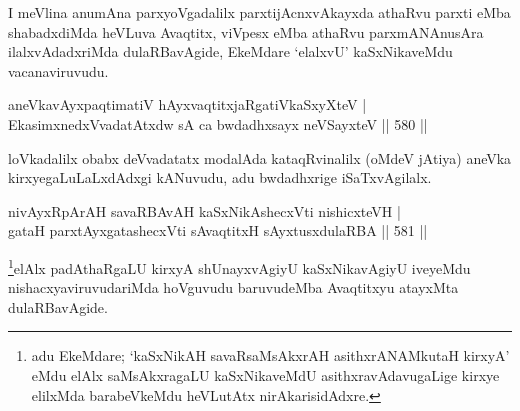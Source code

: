 \begin{artha}
I meVlina anumAna parxyoVgadalilx parxtijAcnxvAkayxda athaRvu parxti eMba shabadxdiMda heVLuva Avaqtitx, viVpesx eMba athaRvu parxmANAnusAra ilalxvAdadxriMda dulaRBavAgide, EkeMdare `elalxvU' kaSxNikaveMdu vacanaviruvudu.
\end{artha}


\begin{shl}
\footnotemark[1]aneVkavAyxpaqtimatiV hAyxvaqtitxjaRgatiVkaSxyXteV | \\
EkasimxnedxVvadatAtxdw sA ca bwdadhxsayx neVSayxteV \hfill||  580 ||  
\end{shl}

\begin{artha}
loVkadalilx obabx deVvadatatx modalAda kataqRvinalilx (oMdeV jAtiya) aneVka kirxyegaLuLaLxdAdxgi kANuvudu, adu bwdadhxrige iSaTxvAgilalx.
\end{artha}

\begin{shl}
nivAyxRpArAH savaRBAvAH kaSxNikAshecxVti nishicxteVH | \\
gataH parxtAyxgatashecxVti sA\s \s vaqtitxH sAyxtusxdulaRBA \hfill||  581 ||  
\end{shl}

\begin{artha}
\footnote{adu EkeMdare; `kaSxNikAH savaRsaMsAkxrAH asithxrANAMkutaH kirxyA' eMdu elAlx saMsAkxragaLU kaSxNikaveMdU asithxravAdavugaLige kirxye elilxMda barabeVkeMdu heVLutAtx nirAkarisidAdxre.}elAlx padAthaRgaLU kirxyA shUnayxvAgiyU kaSxNikavAgiyU iveyeMdu nishacxyaviruvudariMda hoVguvudu baruvudeMba Avaqtitxyu atayxMta dulaRBavAgide.
\end{artha}


